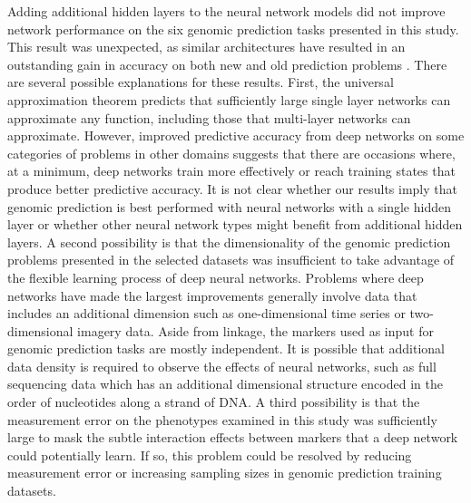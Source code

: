 Adding additional hidden layers to the neural network models did not improve
network performance on the six genomic prediction tasks presented in this study.
This result was unexpected, as similar architectures have resulted in an outstanding 
gain in accuracy on both new and old prediction problems \citep{mnih2013, subasi2005, lang1990}.
There are several possible explanations for these results. First, the universal
approximation theorem predicts that sufficiently large single layer networks
can approximate any function, including those that multi-layer networks can approximate.
However, improved predictive accuracy from deep networks on some categories of problems
in other domains suggests that there are occasions where, 
at a minimum, deep networks train more effectively or reach training states that 
produce better predictive accuracy. It is not clear whether our results imply that
genomic prediction is best performed with neural networks with a single hidden 
layer or whether other neural network types might benefit from additional hidden layers.
A second possibility is that the dimensionality of the genomic prediction problems
presented in the selected datasets was insufficient to take advantage of the
flexible learning process of deep neural networks. Problems where deep networks have
made the largest improvements generally involve data that includes an additional dimension
such as one-dimensional time series or two-dimensional imagery data. Aside from linkage, the markers used as 
input for genomic prediction tasks are mostly independent. It is possible that 
additional data density is required to observe the effects of neural networks, 
such as full sequencing data which has an additional dimensional structure encoded 
in the order of nucleotides along a strand of DNA. A third possibility is that 
the measurement error on the phenotypes examined in this study was sufficiently 
large to mask the subtle interaction effects between markers that a deep 
network could potentially learn. If so, this problem could be resolved by reducing 
measurement error or increasing sampling sizes in genomic prediction training datasets.  

